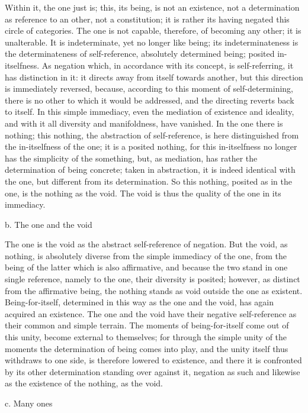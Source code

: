 Within it, the one just is;
this, its being, is not an existence,
not a determination as reference to an other,
not a constitution;
it is rather its having negated this circle of categories.
The one is not capable, therefore,
of becoming any other; it is unalterable.
It is indeterminate, yet no longer like being;
its indeterminateness is the determinateness
of self-reference, absolutely determined being;
posited in-itselfness.
As negation which, in accordance with its concept,
is self-referring, it has distinction in it:
it directs away from itself towards another,
but this direction is immediately reversed,
because, according to this moment of self-determining,
there is no other to which it would be addressed,
and the directing reverts back to itself.
In this simple immediacy,
even the mediation of existence and ideality,
and with it all diversity and manifoldness,
have vanished.
In the one there is nothing;
this nothing, the abstraction of self-reference,
is here distinguished from the in-itselfness of the one;
it is a posited nothing, for this in-itselfness
no longer has the simplicity of the something,
but, as mediation, has rather the determination of being concrete;
taken in abstraction, it is indeed identical with the one,
but different from its determination.
So this nothing, posited as in the one,
is the nothing as the void.
The void is thus the quality of
the one in its immediacy.

b. The one and the void

The one is the void as the abstract self-reference of negation.
But the void, as nothing, is absolutely diverse
from the simple immediacy of the one,
from the being of the latter which is also affirmative,
and because the two stand in one single reference,
namely to the one, their diversity is posited;
however, as distinct from the affirmative being,
the nothing stands as void outside the one as existent.
Being-for-itself, determined in this way
as the one and the void,
has again acquired an existence.
The one and the void have their negative self-reference
as their common and simple terrain.
The moments of being-for-itself
come out of this unity,
become external to themselves;
for through the simple unity of the moments
the determination of being comes into play,
and the unity itself thus withdraws to one side,
is therefore lowered to existence,
and there it is confronted by its other determination
standing over against it, negation as such
and likewise as the existence of the nothing,
as the void.

c. Many ones

